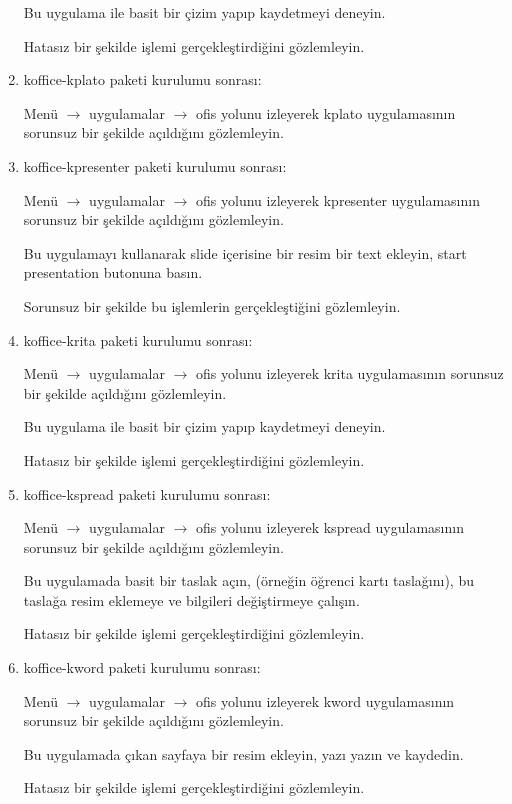 \documentclass[a4paper,10pt]{article}
\begin{document}
\begin{enumerate}
Bu uygulama ile basit bir çizim yapıp kaydetmeyi deneyin.

Hatasız bir şekilde işlemi gerçekleştirdiğini gözlemleyin.

\item koffice-kplato paketi kurulumu sonrası:

Menü $\rightarrow$ uygulamalar $\rightarrow$ ofis yolunu izleyerek kplato uygulamasının sorunsuz bir şekilde açıldığını gözlemleyin.

\item koffice-kpresenter paketi kurulumu sonrası:

Menü $\rightarrow$ uygulamalar $\rightarrow$ ofis yolunu izleyerek kpresenter uygulamasının sorunsuz bir şekilde açıldığını gözlemleyin.

Bu uygulamayı kullanarak slide içerisine bir resim bir text ekleyin, start presentation butonuna basın.

Sorunsuz bir şekilde bu işlemlerin gerçekleştiğini gözlemleyin.

\item koffice-krita paketi kurulumu sonrası:

Menü $\rightarrow$ uygulamalar $\rightarrow$ ofis yolunu izleyerek krita uygulamasının sorunsuz bir şekilde açıldığını gözlemleyin.

Bu uygulama ile basit bir çizim yapıp kaydetmeyi deneyin.

Hatasız bir şekilde işlemi gerçekleştirdiğini gözlemleyin.

\item koffice-kspread paketi kurulumu sonrası:

Menü $\rightarrow$ uygulamalar $\rightarrow$ ofis yolunu izleyerek kspread uygulamasının sorunsuz bir şekilde açıldığını gözlemleyin.

Bu uygulamada basit bir taslak açın, (örneğin öğrenci kartı taslağını), bu taslağa resim eklemeye ve bilgileri değiştirmeye çalışın.

Hatasız bir şekilde işlemi gerçekleştirdiğini gözlemleyin.

\item koffice-kword paketi kurulumu sonrası:

Menü $\rightarrow$ uygulamalar $\rightarrow$ ofis yolunu izleyerek kword uygulamasının sorunsuz bir şekilde açıldığını gözlemleyin.

Bu uygulamada çıkan sayfaya bir resim ekleyin, yazı yazın ve kaydedin.

Hatasız bir şekilde işlemi gerçekleştirdiğini gözlemleyin.
\end{enumerate}
\end{document}
